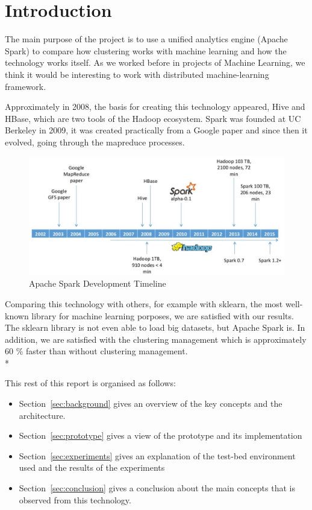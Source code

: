 \section{Introduction}
\label{sec:introduction}


The main purpose of the project is to use a unified analytics engine (Apache Spark) to compare how clustering works with machine learning and how the technology works itself. As we worked before in projects of Machine Learning, we think it would be interesting to work with distributed machine-learning framework.


Approximately in 2008, the basis for creating this technology appeared, Hive and HBase, which are two tools of the Hadoop ecosystem.  
Spark was founded at UC Berkeley in 2009, it was created practically from a Google paper and since then it evolved, going through the mapreduce processes.



\noindent
\begin{figure}[H]
	\centering
	\includegraphics[scale=0.3]{figs/TimelineSpark.jpg}
	\caption{Apache Spark Development Timeline}
	\label{fig:timeline}
\end{figure}

Comparing this technology with others, for example with sklearn, the most well-known library for machine learning porposes, we are satisfied with our results. The sklearn library is not even able to load big datasets, but Apache Spark is. In addition, we are satisfied with the clustering management which is approximately 60 \% faster than without clustering management. \\*

\noindent

This rest of this report is organised as follows:

\begin{itemize}


\item Section~\ref*{sec:background} gives an overview of the key concepts and the architecture.

\item Section~\ref*{sec:prototype} gives a view of the prototype and its implementation

\item Section~\ref*{sec:experiments} gives an explanation of the test-bed environment used and the results of the experiments

\item Section~\ref*{sec:conclusion} gives a conclusion about the main concepts that is observed from this technology.

\end{itemize}
\noindent